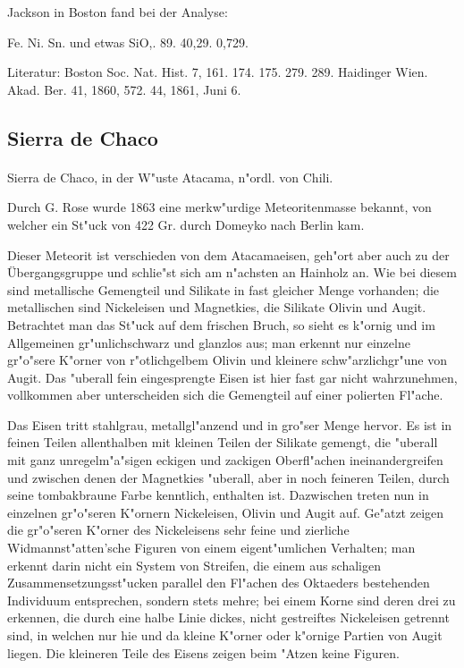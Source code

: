 \documentclass[a4paper, 11pt, oneside]{article}
\begin{document}
Jackson in Boston fand bei der Analyse:

Fe. Ni. Sn. und etwas SiO,.
89. 40,29. 0,729.

Literatur: Boston Soc. Nat. Hist. 7, 161. 174. 175. 279. 289. Haidinger Wien. Akad. Ber. 41, 1860, 572. 44, 1861, Juni 6.

\subsection{Sierra de Chaco}
\normalsize
\paragraph{}
Sierra de Chaco, in der W"uste Atacama, n"ordl. von Chili.

Durch G. Rose wurde 1863 eine merkw"urdige Meteoritenmasse bekannt, von welcher ein St"uck von 422 Gr. durch Domeyko nach Berlin kam.

Dieser Meteorit ist verschieden von dem Atacamaeisen, geh"ort aber auch zu der Übergangsgruppe und schlie"st sich am n"achsten an Hainholz an. Wie bei diesem sind metallische Gemengteil und Silikate in fast gleicher Menge vorhanden; die metallischen sind Nickeleisen und Magnetkies, die Silikate Olivin und Augit. Betrachtet man das St"uck auf dem frischen Bruch, so sieht es k"ornig und im Allgemeinen gr"unlichschwarz und glanzlos aus; man erkennt nur einzelne gr"o"sere K"orner von r"otlichgelbem Olivin und kleinere schw"arzlichgr"une von Augit. Das "uberall fein eingesprengte Eisen ist hier fast gar nicht wahrzunehmen, vollkommen aber unterscheiden sich die Gemengteil auf einer polierten Fl"ache.

Das Eisen tritt stahlgrau, metallgl"anzend und in gro"ser Menge hervor. Es ist in feinen Teilen allenthalben mit kleinen Teilen der Silikate gemengt, die "uberall mit ganz unregelm"a"sigen eckigen und zackigen Oberfl"achen ineinandergreifen und zwischen denen der Magnetkies "uberall, aber in noch feineren Teilen, durch seine tombakbraune Farbe kenntlich, enthalten ist. Dazwischen treten nun in einzelnen gr"o"seren K"ornern Nickeleisen, Olivin und Augit auf. Ge"atzt zeigen die gr"o"seren K"orner des Nickeleisens sehr feine und zierliche Widmannst"atten'sche Figuren von einem eigent"umlichen Verhalten; man erkennt darin nicht ein System von Streifen, die einem aus schaligen Zusammensetzungsst"ucken parallel den Fl"achen des Oktaeders bestehenden Individuum entsprechen, sondern stets mehre; bei einem Korne sind deren drei zu erkennen, die durch eine halbe Linie dickes, nicht gestreiftes Nickeleisen getrennt sind, in welchen nur hie und da kleine K"orner oder k"ornige Partien von Augit liegen. Die kleineren Teile des Eisens zeigen beim "Atzen keine Figuren.
\end{document}

